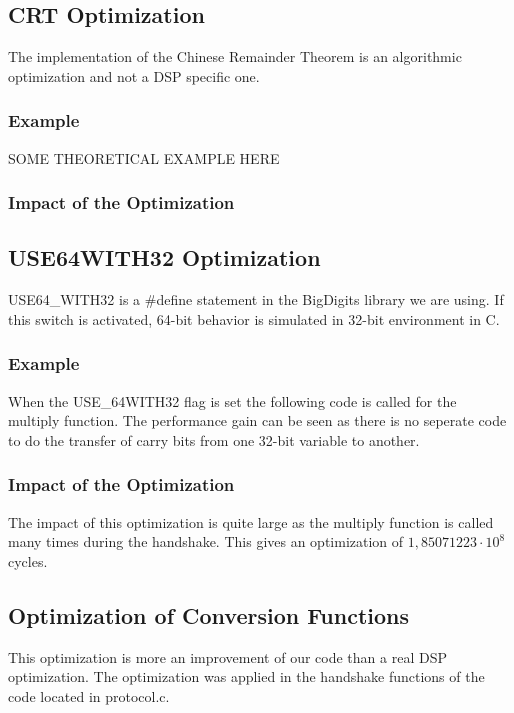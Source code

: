 \documentclass[a4paper]{article}
\begin{document}
\subsection{CRT Optimization}
The implementation of the Chinese Remainder Theorem is an algorithmic optimization and not a DSP specific one. 

\subsubsection{Example}
SOME THEORETICAL EXAMPLE HERE

\subsubsection{Impact of the Optimization}

\subsection{USE64WITH32 Optimization}
USE64\_WITH32 is a $\#$define statement in the BigDigits library we are using. If this switch is activated, 64-bit behavior is simulated in 32-bit environment in C.

\subsubsection{Example}
When the USE\_64WITH32 flag is set the following code is called for the multiply function. The performance gain can be seen as there is no seperate code to do the transfer of carry bits from one 32-bit variable to another.



\subsubsection{Impact of the Optimization}
The impact of this optimization is quite large as the multiply function is called many times during the handshake. This gives an optimization of $1,85071223\cdot10^{8}$ cycles.

\subsection{Optimization of Conversion Functions}
This optimization is more an improvement of our code than a real DSP optimization. The optimization was applied in the handshake functions of the code located in protocol.c.\\
\end{document}
